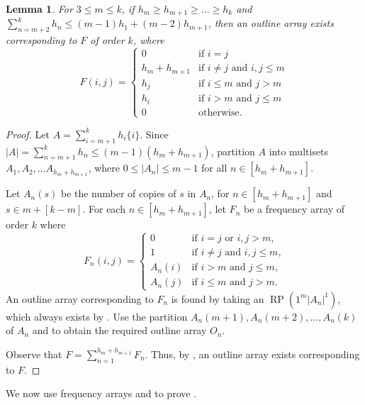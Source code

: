\documentclass{sn-jnl}
\newtheorem{lemma}[theorem]{Lemma}
\theoremstyle{definition}
\DeclareMathOperator{\LS}{RP}
\begin{document}
\begin{lemma}
\label{lemma: frequency array to add on}
    For $3\leq m\leq k$, if $h_m\geq h_{m+1}\geq\dots\geq h_{k}$ and $\sum_{n=m+2}^{k}h_n \leq (m-1)h_1 + (m-2)h_{m+1}$, then an outline array exists corresponding to $F$ of order $k$, where
    $$F(i,j) = \begin{cases}
        0 & \text{if $i=j$}\\
        h_m+h_{m+1} & \text{if $i\neq j$ and $i,j\leq m$}\\
        h_{j} & \text{if $i\leq m$ and $j>m$}\\
        h_{i} & \text{if $i>m$ and $j\leq m$}\\
        0 & \text{otherwise.}
    \end{cases}$$
\end{lemma}
\begin{proof}
    Let $A = \sum_{i=m+1}^k h_i\{i\}$. Since $|A| = \sum_{n=m+1}^{k}h_n \leq (m-1)(h_m+h_{m+1})$, partition $A$ into multisets $A_1,A_2,\dots A_{h_m+h_{m+1}}$, where $0\leq |A_n| \leq m-1$ for all $n\in[h_m+h_{m+1}]$.

    Let $A_n(s)$ be the number of copies of $s$ in $A_n$, for $n\in[h_m+h_{m+1}]$ and $s\in m+[k-m]$. For each $n\in[h_m+h_{m+1}]$, let $F_n$ be a frequency array of order $k$ where
    $$F_n(i,j) = \begin{cases}
        0 & \text{if $i=j$ or $i,j>m$,}\\
        1 & \text{if $i\neq j$ and $i,j\leq m$,}\\
        A_n(i) & \text{if $i>m$ and $j\leq m$,}\\
        A_n(j) & \text{if $i\leq m$ and $j>m$.}
    \end{cases}$$
    An outline array corresponding to $F_n$ is found by taking an $\LS(1^m|A_n|^1)$, which always exists by . Use the partition $A_n(m+1),A_n(m+2),\dots,A_n(k)$ of $A_n$ and  to obtain the required outline array $O_n$.

    Observe that $F = \sum_{n=1}^{h_m+h_{m+1}} F_n$. Thus, by , an outline array exists corresponding to $F$.
\end{proof}

We now use frequency arrays and  to prove .
\end{document}
